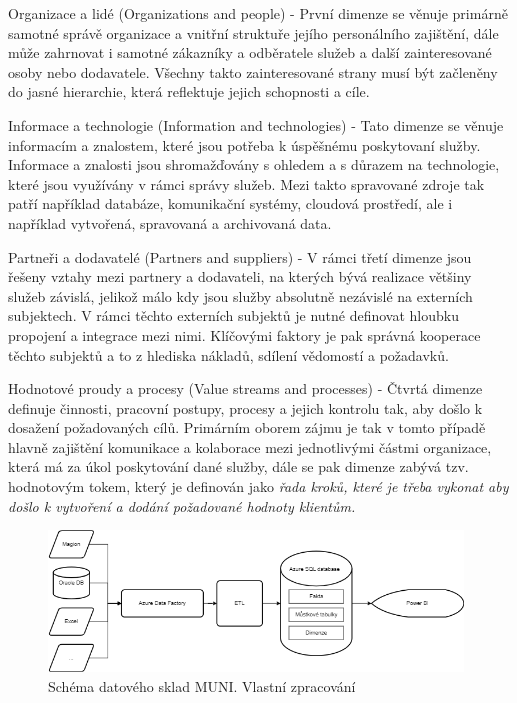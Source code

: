 \documentclass[
  digital,     %
  twoside,     %
  lof,         %
  lot,         %
]{fithesis4}
\begin{document}
\begin{compactitem}
    \item Organizace a lidé (Organizations and people) - První dimenze se věnuje primárně samotné správě organizace a vnitřní struktuře jejího personálního zajištění, dále může zahrnovat i samotné zákazníky a odběratele služeb a další zainteresované osoby nebo dodavatele. Všechny takto zainteresované strany musí být začleněny do jasné hierarchie, která reflektuje jejich schopnosti a cíle. 
    \item Informace a technologie (Information and technologies) - Tato dimenze se věnuje informacím a znalostem, které jsou potřeba k úspěšnému poskytovaní služby. Informace a znalosti jsou shromažďovány s ohledem a s důrazem na technologie, které jsou využívány v rámci správy služeb. Mezi takto spravované zdroje tak patří například databáze, komunikační systémy, cloudová prostředí, ale i například vytvořená, spravovaná a archivovaná data.
    \item Partneři a dodavatelé (Partners and suppliers) - V rámci třetí dimenze jsou řešeny vztahy mezi partnery a dodavateli, na kterých bývá realizace většiny služeb závislá, jelikož málo kdy jsou služby absolutně nezávislé na externích subjektech. V rámci těchto externích subjektů je nutné definovat hloubku propojení a integrace mezi nimi. Klíčovými faktory je pak správná kooperace těchto subjektů a to z hlediska nákladů, sdílení vědomostí a požadavků.
    \item Hodnotové proudy a procesy (Value streams and processes) - Čtvrtá dimenze definuje činnosti, pracovní postupy, procesy a jejich kontrolu tak, aby došlo k dosažení požadovaných cílů. Primárním oborem zájmu je tak v tomto případě hlavně zajištění komunikace a kolaborace mezi jednotlivými částmi organizace, která má za úkol poskytování dané služby, dále se pak dimenze zabývá tzv. hodnotovým tokem, který je definován jako \emph{řada kroků, které je třeba vykonat aby došlo k vytvoření a dodání požadované hodnoty klientům.}
\end{compactitem}

    \begin{figure}[t]
        \begin{center}
            \includegraphics[width=11cm]{img/dwh_muni.png}
        \end{center}
        \caption{Schéma datového sklad MUNI. Vlastní zpracování}
        \label{fig:dwh_muni}
    \end{figure} 
    
\end{document}
